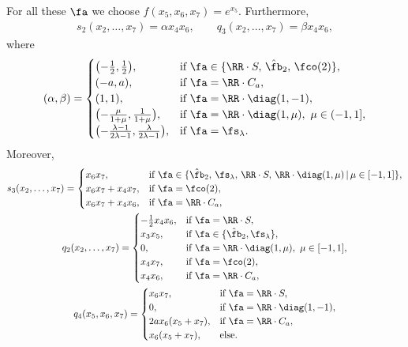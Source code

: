 For all these $\fa$ we choose $f(x_5,x_6,x_7) = e^{x_5}$. Furthermore, \begin{gather*}s_2(x_2,\dots, x_7)=\alpha x_4x_6,\qquad q_3(x_2,\dots, x_7)=\beta x_4x_6,\end{gather*} where
\begin{gather*} (\alpha,\beta) = \begin{cases}
\big({-}\tfrac12, \tfrac12\big), & \text{if } \fa\in \{\RR\cdot S,\, \hat \fb_2,\, \fco(2) \},\\
(-a,a),& \text{if } \fa=\RR\cdot C_a,\\
(1,1),& \text{if } \fa=\RR\cdot\diag(1,-1),\\
\big({-}\tfrac{\mu}{1+\mu}, \tfrac1{1+\mu}\big), & \text{if } \fa=\RR\cdot\diag(1,\mu),\ \mu\in(-1,1],\\
 \big({-}\tfrac{\lambda-1}{2\lambda -1}, \tfrac \lambda{2\lambda-1}\big), & \text{if } \fa=\fs_\lambda.\\
\end{cases}\end{gather*}
Moreover,
\begin{gather*}
 s_3 (x_2, \dots, x_7) = \begin{cases}
x_6x_7,& \text{if } \fa \in\{ \hat \fb_2,\, \fs_\lambda ,\, \RR\cdot S,\, \RR\cdot\diag(1,\mu) \,|\,\mu\in [-1,1] \}, \\
x_6x_7+x_4x_7,& \text{if } \fa =\fco(2) , \\
x_6x_7+x_4x_6,& \text{if } \fa =\RR\cdot C_a ,
\end{cases} \\
q_2 (x_2, \dots, x_7) = \begin{cases}
-\tfrac12 x_4x_6,& \text{if } \fa=\RR\cdot S, \\
x_3x_5,& \text{if } \fa \in\{\hat\fb_2,\fs_\lambda\} , \\
0,& \text{if } \fa =\RR\cdot \diag(1,\mu) , \ \mu\in[-1,1], \\
x_4x_7,& \text{if } \fa =\fco(2),\\
x_4x_6,& \text{if } \fa =\RR\cdot C_a,
\end{cases}\\
q_4(x_5,x_6, x_7)=\begin{cases}x_6x_7,& \text{if } \fa=\RR\cdot S,\\
0,& \text{if } \fa=\RR\cdot \diag(1,-1),\\
2ax_6(x_5+x_7) ,& \text{if } \fa=\RR\cdot C_a,\\
x_6(x_5+x_7),& \text{else.}
\end{cases}
\end{gather*}
